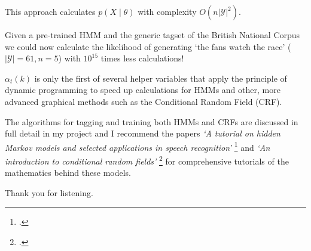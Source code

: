 \documentclass[envcountsect]{beamer}
\begin{document}
\begin{frame}

This approach calculates $p(X \mid \theta)$ with complexity $O(n|\mathcal{Y}|^2)$.

Given a pre-trained HMM and the generic tagset of the British National Corpus we could now calculate the likelihood of generating `the fans watch the race' ($|\mathcal{Y}|=61,n=5$) with $10^{15}$ times less calculations!

\pause

\vspace{0.5cm}

$\alpha_t(k)$ is only the first of several helper variables that apply the principle of dynamic programming to speed up calculations for HMMs and other, more advanced graphical methods such as the Conditional Random Field (CRF).

\vspace{0.5cm}

The algorithms for tagging and training both HMMs and CRFs are discussed in full detail in my project and I recommend the papers \textit{`A tutorial on hidden Markov models and selected applications in speech recognition'} \footcite{rabiner-1989-tutorial} and \textit{`An introduction to conditional random fields'} \footcite{sutton-2012-crfintro} for comprehensive tutorials of the mathematics behind these models.


\end{frame}

\begin{frame}
\begin{center}
    \huge Thank you for listening.
\end{center}
\end{frame}
\end{document}

